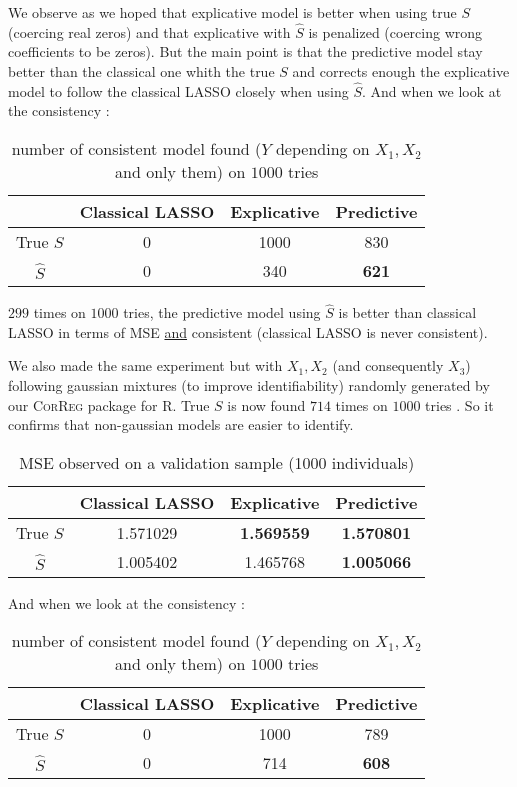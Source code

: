 \documentclass[11pt,a4paper]{report}
\begin{document}
		We observe as we hoped that explicative model is better when using true $S$ (coercing real zeros) and that explicative with $\hat{S}$ is penalized (coercing wrong coefficients to be zeros).
		But the main point is that the predictive model stay better than the classical one whith the true $S$ and corrects enough the explicative model to follow the classical LASSO closely when using $\hat{S}$. 
		And when we look at the consistency :
		\begin{table}[h!]	
		\centering
		\begin{tabular}{|c|c|c|c|}
		\hline 
		 & Classical LASSO & Explicative & Predictive \\ 
		\hline 
		True $S$ &  0 & 1000 & 830 \\ 
		\hline 
		$\hat{S}$ & 0 & 340 & \textbf{621} \\ 
		\hline 
		\end{tabular} 
		\caption{number of consistent model found ($Y$ depending on $X_1,X_2$ and only them) on $1000$ tries}
		\end{table}				
		
		$299$ times on $1000$ tries, the predictive model using $\hat{S}$ is better than classical LASSO in terms of MSE \underline{and} consistent (classical LASSO is never consistent).
		
		We also made the same experiment but with $X_1,X_2$ (and consequently $X_3$) following gaussian mixtures (to improve identifiability) randomly generated by our \textsc{CorReg} package for R. 
		True $S$ is now found $714$ times on $1000$ tries \label{testidentifiable}. So it confirms that non-gaussian models are easier to identify.
		
		
		\begin{table}[h!]
		\centering
		\begin{tabular}{|c|c|c|c|}
		\hline 
		 & Classical LASSO & Explicative & Predictive \\ 
		\hline 
		True $S$ &  1.571029 & \textbf{1.569559} & \textbf{1.570801} \\ 
		\hline 
		$\hat{S}$ & 1.005402 & 1.465768 & \textbf{1.005066} \\ 
		\hline 
		\end{tabular} 
		\caption{MSE observed on a validation sample (1000 individuals)}
		\end{table}

		And when we look at the consistency :
		\begin{table}[h!]
		\centering	
		\begin{tabular}{|c|c|c|c|}
		\hline 
		 & Classical LASSO & Explicative & Predictive \\ 
		\hline 
		True $S$ &  0 & 1000 & 789 \\ 
		\hline 
		$\hat{S}$ & 0 & 714 & \textbf{608} \\ 
		\hline 
		\end{tabular} 
		\caption{number of consistent model found ($Y$ depending on $X_1,X_2$ and only them) on $1000$ tries}
		\end{table}				
				
\end{document}
